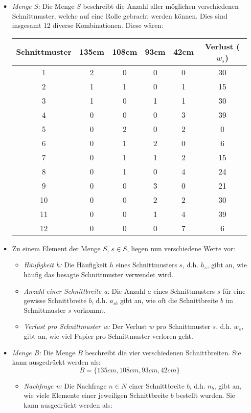 \begin{itemize}
\item \emph{Menge S:} Die Menge $S$ beschreibt die Anzahl aller möglichen verschiedenen Schnittmuster, welche auf eine Rolle gebracht werden können. Dies sind insgesamt 12 diverse Kombinationen. Diese wären:

\begin{tabular}{|c|c|c|c|c|c|}
\hline Schnittmuster & 135cm & 108cm & 93cm & 42cm & Verlust ($w_s$) \\ 
\hline 1 & 2 & 0 & 0 & 0 & 30 \\ 
\hline 2 & 1 & 1 & 0 & 1 & 15 \\ 
\hline 3 & 1 & 0 & 1 & 1 & 30 \\ 
\hline 4 & 0 & 0 & 0 & 3 & 39 \\ 
\hline 5 & 0 & 2 & 0 & 2 & 0 \\ 
\hline 6 & 0 & 1 & 2 & 0 & 6 \\ 
\hline 7 & 0 & 1 & 1 & 2 & 15 \\ 
\hline 8 & 0 & 1 & 0 & 4 & 24 \\
\hline 9 & 0 & 0 & 3 & 0 & 21 \\ 
\hline 10 & 0 & 0 & 2 & 2 & 30 \\ 
\hline 11 & 0 & 0 & 1 & 4 & 39 \\ 
\hline 12 & 0 & 0 & 0 & 7 & 6 \\ 
\hline 
\end{tabular} 

\item Zu einem Element der Menge $S$, $s \in S$, liegen nun verschiedene Werte vor:
\begin{itemize}
\item \emph{Häufigkeit h:} Die Häufigkeit $h$ eines Schnittmusters $s$, d.h. $h_s$, gibt an, wie häufig das besagte Schnittmuster verwendet wird.
\item \emph{Anzahl einer Schnittbreite a:}	Die Anzahl $a$ eines Schnittmusters $s$ für eine gewisse Schnittbreite $b$, d.h. $a_{sb}$ gibt an, wie oft die Schnittbreite $b$ im Schnittmuster $s$ vorkommt.
\item \emph{Verlust pro Schnittmuster w:} Der Verlust $w$ pro Schnittmuster $s$, d.h. $w_s$, gibt an, wie viel Papier pro Schnittmuster verloren geht.
\end{itemize}
\item \emph{Menge B:} Die Menge $B$ beschreibt die vier verschiedenen Schnittbreiten. Sie kann ausgedrückt werden als: 
\[ B = \{135cm,108cm,93cm,42cm\} \]
\begin{itemize}
\item \emph{Nachfrage n:} Die Nachfrage $n \in N$ einer Schnittbreite $b$, d.h. $n_b$, gibt an, wie viele Elemente einer jeweiligen Schnittbreite $b$ bestellt wurden. Sie kann ausgedrückt werden als: 


\end{itemize}
\end{itemize}
